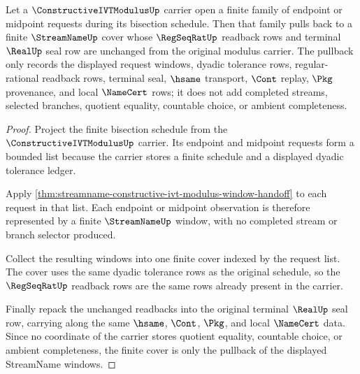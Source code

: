 \begin{theorem}
\label{thm:streamname-finite-request-cover-pullback}
Let a $\ConstructiveIVTModulusUp$ carrier open a finite family of endpoint or midpoint requests during its bisection schedule. Then that family pulls back to a finite $\StreamNameUp$ cover whose $\RegSeqRatUp$ readback rows and terminal $\RealUp$ seal row are unchanged from the original modulus carrier. The pullback only records the displayed request windows, dyadic tolerance rows, regular-rational readback rows, terminal seal, $\hsame$ transport, $\Cont$ replay, $\Pkg$ provenance, and local $\NameCert$ rows; it does not add completed streams, selected branches, quotient equality, countable choice, or ambient completeness.
\end{theorem}
\begin{proof}
Project the finite bisection schedule from the $\ConstructiveIVTModulusUp$ carrier. Its endpoint and midpoint requests form a bounded list because the carrier stores a finite schedule and a displayed dyadic tolerance ledger.

Apply \autoref{thm:streamname-constructive-ivt-modulus-window-handoff} to each request in that list. Each endpoint or midpoint observation is therefore represented by a finite $\StreamNameUp$ window, with no completed stream or branch selector produced.

Collect the resulting windows into one finite cover indexed by the request list. The cover uses the same dyadic tolerance rows as the original schedule, so the $\RegSeqRatUp$ readback rows are the same rows already present in the carrier.

Finally repack the unchanged readbacks into the original terminal $\RealUp$ seal row, carrying along the same $\hsame$, $\Cont$, $\Pkg$, and local $\NameCert$ data. Since no coordinate of the carrier stores quotient equality, countable choice, or ambient completeness, the finite cover is only the pullback of the displayed StreamName windows.
\end{proof}
